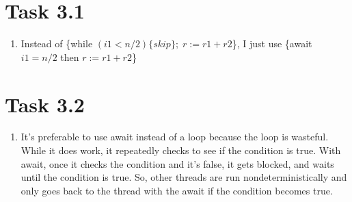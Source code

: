 \documentclass{article}
\newcommand{\answer}{\item[]} %
\begin{document}
	\section{Task 3.1}
		\begin{enumerate}[label = {(\alph*)}]
			
			\answer Instead of \{while $(i1 < n / 2) \{skip\}; \; r := r1 + r2$\}, I just use \{await $i1 = n / 2$ then $r := r1 + r2$\}
			
		\end{enumerate}
	
	\section{Task 3.2}
		\begin{enumerate}[label = {(\alph*)}]
			
			\answer It's preferable to use await instead of a loop because the loop is wasteful. While it does work, it repeatedly checks to see if the condition is true. With await, once it checks the condition and it's false, it gets blocked, and waits until the condition is true. So, other threads are run nondeterministically and only goes back to the thread with the await if the condition becomes true.
			
		\end{enumerate}
	
\end{document}
